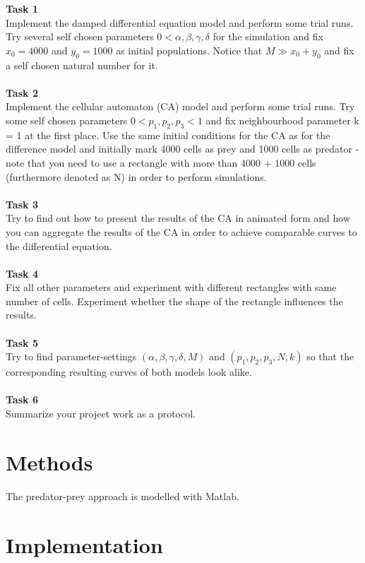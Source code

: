 \documentclass[a4paper,12pt]{article}
\begin{document}
\textbf {Task 1}\\ 
Implement the damped differential equation model and perform some trial runs. Try several self chosen
parameters $0 < \alpha,\beta,\gamma,\delta$ for the simulation and fix $x_0 = 4000$ and $y_0 = 1000$ as initial populations.
Notice that $M  \gg x_0 + y_0$ and fix a self chosen natural number for it. \\ \ \\
\textbf {Task 2}\\ 
Implement the cellular automaton (CA) model and perform some trial runs. Try some self chosen
parameters $0 < p_1, p_2, p_3 < 1$ and fix neighbourhood parameter k = 1 at the first place. Use the same
initial conditions for the CA as for the difference model and initially mark 4000 cells as prey and 1000
cells as predator - note that you need to use a rectangle with more than 4000 + 1000 cells (furthermore
denoted as N) in order to perform simulations.\\ \ \\
\textbf {Task 3}\\ 
Try to find out how to present the results of the CA in animated form and how you can aggregate the
results of the CA in order to achieve comparable curves to the differential equation.\\ \ \\
\textbf {Task 4}\\ 
Fix all other parameters and experiment with different rectangles with same number of cells. Experiment
whether the shape of the rectangle influences the results.\\ \ \\
\textbf {Task 5}\\ 
Try to find parameter-settings $(\alpha,\beta,\gamma,\delta, M)$ and $(p_1, p_2, p_3,N, k)$ so that the corresponding resulting
curves of both models look alike.\\ \ \\
\textbf {Task 6}\\ 
Summarize your project work as a protocol.\\ 

\section{Methods}
The predator-prey approach is modelled with Matlab.

\section{Implementation}
\end{document}
